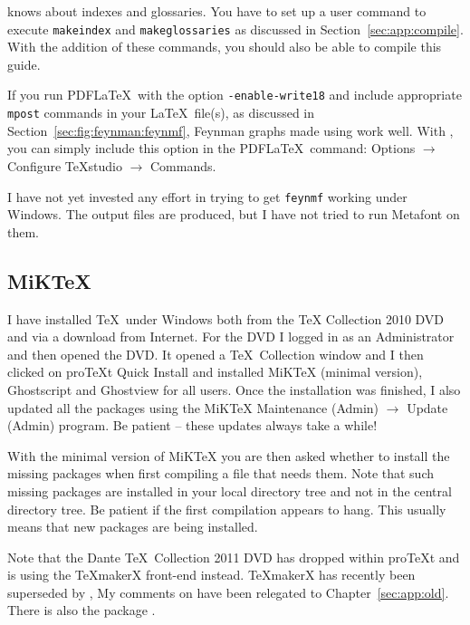 \TeXstudio knows about indexes and glossaries. You have to set up a
user command to execute \texttt{makeindex} and \texttt{makeglossaries}
as discussed in Section~\ref{sec:app:compile}. With the addition of
these commands, you should also be able to compile this guide.

If you run PDF\LaTeX\ with the option \texttt{-enable-write18} and
include appropriate \texttt{mpost} commands in your \LaTeX\ file(s), as
discussed in Section~\ref{sec:fig:feynman:feynmf}, Feynman graphs made
using  work well. With \TeXstudio, you can simply
include this option in the PDF\LaTeX\ command: \textsf{Options} $\to$
\textsf{Configure TeXstudio} $\to$ \textsf{Commands}.

I have not yet invested any effort in trying to get \texttt{feynmf}
working under Windows. The output files are produced, but I have not
tried to run Metafont on them.


\subsection{MiK\TeX}
\label{sec:app:miktex}

I have installed \TeX\ under Windows both from the \TeX{} Collection
2010 DVD and via a download from Internet. For the DVD I logged in as
an Administrator and then opened the DVD. It opened a \TeX\ Collection
window and I then clicked on pro\TeX t Quick Install and installed
MiK\TeX{} (minimal version),
Ghostscript and Ghostview for all
users. Once the installation was finished, I also updated all the
packages using the MiK\TeX{} Maintenance (Admin) $\to$ Update (Admin)
program. Be patient -- these updates always take a while!

With the minimal version of MiK\TeX{} you are then asked whether to
install the missing packages when first compiling a file that needs
them. Note that such missing packages are installed in your local
directory tree and not in the central directory tree. Be patient if
the first compilation appears to hang. This usually means that new
packages are being installed.

Note that the Dante \TeX\ Collection 2011 DVD has dropped
\TeXnicCenter within pro\TeX t and is using the \TeX makerX front-end
instead. \TeX makerX has recently been superseded by \TeXstudio, My
comments on \TeXnicCenter have been relegated to
Chapter~\ref{sec:app:old}. There is also the package \TeXmaker.


